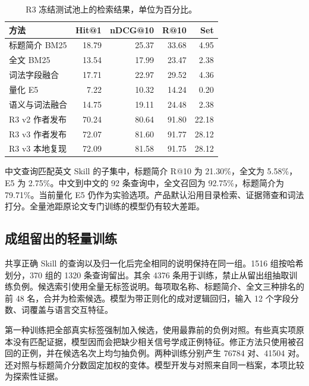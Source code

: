 \documentclass[final,5p,twocolumn,10pt]{elsarticle}
\begin{document}
\begin{table}[!ht]
\centering\small
\caption{R3 冻结测试池上的检索结果，单位为百分比。}
\label{tab:r3all}
\begin{tabularx}{\columnwidth}{@{}Xrrrr@{}}
\toprule
方法 & Hit@1 & nDCG@10 & R@10 & Set \\
\midrule
标题简介 BM25 & 18.79 & 25.37 & 33.68 & 4.95 \\
全文 BM25 & 13.54 & 17.99 & 23.47 & 2.38 \\
词法字段融合 & 17.71 & 22.97 & 29.52 & 4.36 \\
量化 E5 & 7.22 & 10.32 & 14.24 & 0.20 \\
语义与词法融合 & 14.75 & 19.11 & 24.48 & 2.38 \\
R3 v2 作者发布 & 70.24 & 80.64 & 91.80 & 22.18 \\
R3 v3 作者发布 & 72.07 & 81.60 & 91.77 & 28.12 \\
R3 v3 本地复现 & 72.09 & 81.58 & 91.75 & 28.12 \\
\bottomrule
\end{tabularx}
\end{table}

中文查询匹配英文 Skill 的子集中，标题简介 R@10 为 21.30\%，全文为 5.58\%，E5 为 2.75\%。中文到中文的 92 条查询中，全文召回为 92.75\%，标题简介为 79.71\%。当前量化 E5 仍作为实验选项。产品默认沿用目录检索、证据筛查和词法打分。全量池距原论文专门训练的模型仍有较大差距。

\subsection{成组留出的轻量训练}

共享正确 Skill 的查询以及归一化后完全相同的说明保持在同一组。1516 组按哈希划分，370 组的 1320 条查询留出。其余 4376 条用于训练，禁止从留出组抽取训练负例。候选索引使用全量无标签说明。每项取名称、标题简介、全文三种排名的前 48 名，合并为检索候选。模型为带正则化的成对逻辑回归，输入 12 个字段分数、词覆盖与语言交互特征。

第一种训练把全部真实标签强制加入候选，使用最靠前的负例对照。有些真实项原本没有匹配证据，模型因而会把缺少相关信号学成正例特征。修正方法只使用被召回的正例，并在候选名次上均匀抽负例。两种训练分别产生 76784 对、41504 对。还对照与标题简介分数固定加权的变体。模型开发与对照来自同一档案，本项比较为探索性证据。
\end{document}
